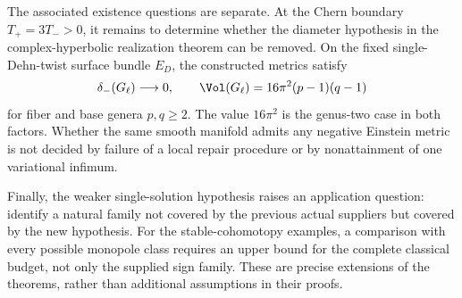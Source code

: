 The associated existence questions are separate. At the Chern boundary
$T_+=3T_->0$, it remains to determine whether the diameter hypothesis in
the complex-hyperbolic realization theorem can be removed. On the fixed
single-Dehn-twist surface bundle $E_D$, the constructed metrics satisfy
\[
 \delta_-(G_\ell)\longrightarrow0,\qquad
 \Vol(G_\ell)=16\pi^2(p-1)(q-1)
\]
for fiber and base genera $p,q\ge2$. The value $16\pi^2$ is the
genus-two case in both factors. Whether the same smooth manifold admits
any negative Einstein metric is not decided by failure of a local repair
procedure or by nonattainment of one variational infimum.

Finally, the weaker single-solution hypothesis raises an application
question: identify a natural family not covered by the previous actual
suppliers but covered by the new hypothesis. For the stable-cohomotopy
examples, a comparison with every possible monopole class requires an
upper bound for the complete classical budget, not only the supplied
sign family. These are precise extensions of the theorems, rather than
additional assumptions in their proofs.
